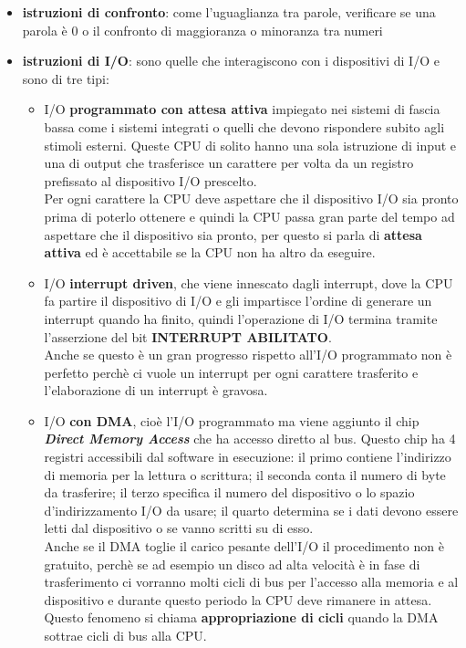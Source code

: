 \documentclass[12pt]{report}
\begin{document}
		\begin{itemize}
			\item \textbf{istruzioni di confronto}: come l'uguaglianza tra parole, verificare se una parola è 0 o il confronto di maggioranza o minoranza tra numeri
			\item \textbf{istruzioni di I/O}: sono quelle che interagiscono con i dispositivi di I/O e sono di tre tipi:
			\begin{itemize}
				\item I/O \textbf{programmato con attesa attiva} impiegato nei sistemi di fascia bassa come i sistemi integrati o quelli che devono rispondere subito agli stimoli esterni. Queste CPU di solito hanno una sola istruzione di input e una di output che trasferisce un carattere per volta da un registro prefissato al dispositivo I/O prescelto. \\
				Per ogni carattere la CPU deve aspettare che il dispositivo I/O sia pronto prima di poterlo ottenere e quindi la CPU passa gran parte del tempo ad aspettare che il dispositivo sia pronto, per questo si parla di \textbf{attesa attiva} ed è accettabile se la CPU non ha altro da eseguire.
				\item I/O \textbf{interrupt driven}, che viene innescato dagli interrupt, dove la CPU fa partire il dispositivo di I/O e gli impartisce l'ordine di generare un interrupt quando ha finito, quindi l'operazione di I/O termina tramite l'asserzione del bit \textbf{INTERRUPT ABILITATO}. \\
				Anche se questo è un gran progresso rispetto all'I/O programmato non è perfetto perchè ci vuole un interrupt per ogni carattere trasferito e l'elaborazione di un interrupt è gravosa.
				\item I/O \textbf{con DMA}, cioè l'I/O programmato ma viene aggiunto il chip \textbf{\textit{Direct Memory Access}} che ha accesso diretto al bus. Questo chip ha 4 registri accessibili dal software in esecuzione: il primo contiene l'indirizzo di memoria per la lettura o scrittura; il seconda conta il numero di byte da trasferire; il terzo specifica il numero del dispositivo o lo spazio d'indirizzamento I/O da usare; il quarto determina se i dati devono essere letti dal dispositivo o se vanno scritti su di esso. \\
				Anche se il DMA toglie il carico pesante dell'I/O il procedimento non è gratuito, perchè se ad esempio un disco ad alta velocità è in fase di trasferimento ci vorranno molti cicli di bus per l'accesso alla memoria e al dispositivo e durante questo periodo la CPU deve rimanere in attesa. Questo fenomeno si chiama \textbf{appropriazione di cicli} quando la DMA sottrae cicli di bus alla CPU.

\end{itemize}
\end{itemize}
\end{document}
